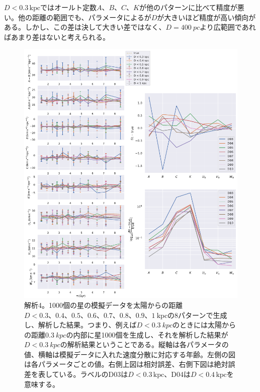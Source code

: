 $D<0.3\,\mathrm{kpc}$ではオールト定数$A、B、C、K$が他のパターンに比べて精度が悪い。他の距離の範囲でも、パラメータによるが$D$が大きいほど精度が高い傾向がある。しかし、この差は決して大きい差ではなく、$D=\SI{400}{pc}$より広範囲であればあまり差はないと考えられる。

\begin{figure}[htbp]
	\centering
	\includegraphics[width=15cm]{fig/Mock_D.pdf}
	\caption{解析4。1000個の星の模擬データを太陽からの距離$D<0.3、0.4、0.5、0.6、0.7、0.8、0.9、1\  \mathrm{kpc}$の8パターンで生成し、解析した結果。つまり、例えば$D<\SI{0.3}{kpc}$のときには太陽からの距離$\SI{0.3}{kpc}$の内部に星1000個を生成し、それを解析した結果が$D<\SI{0.3}{kpc}$の解析結果ということである。縦軸は各パラメータの値、横軸は模擬データに入れた速度分散に対応する年齢。左側の図は各パラメータごとの値。右側上図は相対誤差、右側下図は絶対誤差を表している。ラベルのD03は$D<0.3\,\mathrm{kpc}$、D04は$D<0.4\,\mathrm{kpc}$を意味する。} \label{fig:Mock_D}
\end{figure}


